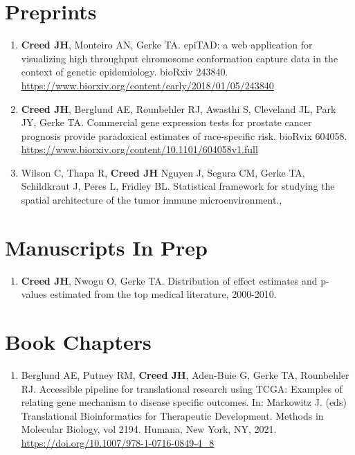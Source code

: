 \documentclass[11pt, a4paper]{article} %
\begin{document}
\section*{Preprints}
\begin{enumerate}[leftmargin=*]

\item{} {\bf Creed JH}, Monteiro AN, Gerke TA. epiTAD: a web application for visualizing high throughput chromosome conformation capture data in the context of genetic epidemiology. bioRxiv 243840. \href{https://www.biorxiv.org/content/early/2018/01/05/243840}{https://www.biorxiv.org/content/early/2018/01/05/243840}

\item{} {\bf Creed JH}, Berglund AE, Rounbehler RJ, Awasthi S, Cleveland JL, Park JY, Gerke TA. Commercial gene expression tests for prostate cancer prognosis provide  paradoxical estimates of race-specific risk. bioRvix 604058. \\\href{https://www.biorxiv.org/content/10.1101/604058v1.full}{https://www.biorxiv.org/content/10.1101/604058v1.full}

\item{} Wilson C, Thapa R, {\bf Creed JH} Nguyen J, Segura CM, Gerke TA, Schildkraut J, Peres L, Fridley BL. Statistical framework for studying the spatial architecture of the tumor immune microenvironment., 
\end{enumerate}

\section*{Manuscripts In Prep}
\begin{enumerate}[leftmargin=*]

\item{} {\bf Creed JH}, Nwogu O, Gerke TA. Distribution of effect estimates and p-values estimated from the top medical literature, 2000-2010. 

\end{enumerate}

\section*{Book Chapters}
\begin{enumerate}[leftmargin=*]

\item{} Berglund AE, Putney RM, {\bf Creed JH}, Aden-Buie G, Gerke TA, Rounbehler RJ. Accessible pipeline for translational research using TCGA: Examples of relating gene mechanism to disease specific outcomes. In: Markowitz J. (eds) Translational Bioinformatics for Therapeutic Development. Methods in Molecular Biology, vol 2194. Humana, New York, NY, 2021. \href{https://doi.org/10.1007/978-1-0716-0849-4_8}{https://doi.org/10.1007/978-1-0716-0849-4\_8} \\

\end{enumerate}
\end{document}
